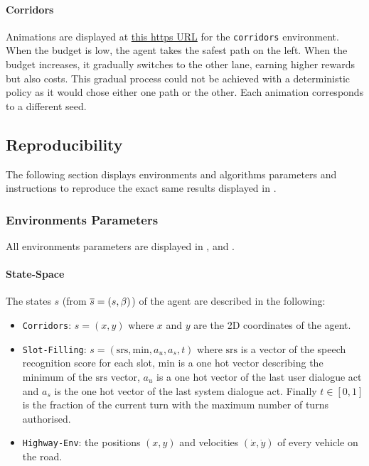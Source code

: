 

\paragraph{Corridors}

Animations are displayed at  \href{https://budgeted-rl.github.io/\#optimal-budgeted-policies-learnt-with-a-risk-sensitive-exploration}{this https URL} for the \texttt{corridors} environment. When the budget is low, the agent takes the safest path on the left. When the budget increases, it gradually switches to the other lane, earning higher rewards but also costs. This gradual process could not be achieved with a deterministic policy as it would chose either one path or the other. Each animation corresponds to a different seed.

\subsection{Reproducibility}
\label{subsec:reproducibility-supp}

The following section displays environments and algorithms parameters and instructions to reproduce the exact same results displayed in .

\subsubsection{Environments Parameters}
\label{sec:env-parameters}

All environments parameters are displayed in ,  and .


\paragraph{State-Space}

The states $s$ (from $\overline{s}=(s,\beta)$) of the agent are described in the following:

\begin{itemize}
    \item \texttt{Corridors}: $s = (x,y)$ where $x$ and $y$ are the 2D coordinates of the agent.
    \item \texttt{Slot-Filling}: $s = (\text{srs},\text{min},a_u,a_s,t)$ where $\text{srs}$ is a vector of the speech recognition score for each slot, $\text{min}$ is a one hot vector describing the minimum of the $\text{srs}$ vector, $a_u$ is a one hot vector of the last user dialogue act and $a_s$ is the one hot vector of the last system dialogue act. Finally $t\in[0,1]$ is the fraction of the current turn with the maximum number of turns authorised.
    \item \texttt{Highway-Env}: the positions $(x, y)$ and velocities $(\dot{x}, \dot{y})$ of every vehicle on the road.
\end{itemize}


